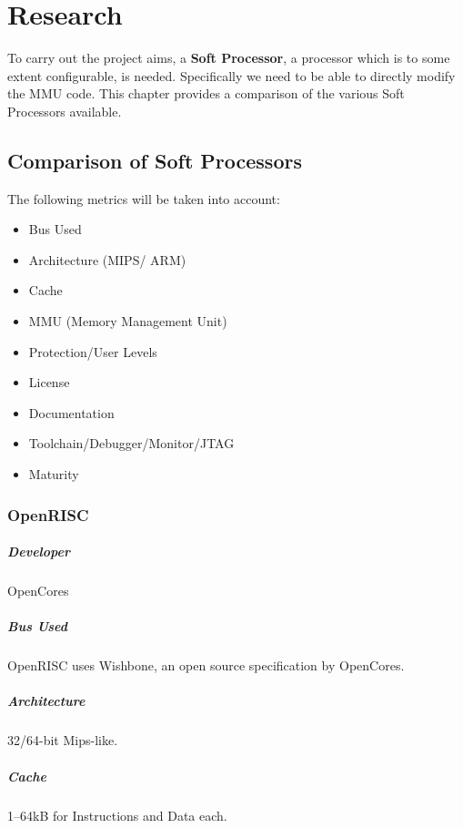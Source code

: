 \chapter{Research}
\label{cha:res}

To carry out the project aims, a \textbf{Soft Processor}, a processor which is to some extent configurable, is needed. Specifically we need to be able to directly modify the MMU code. This chapter provides a comparison of the various Soft Processors available.

\section{Comparison of Soft Processors}
The following metrics will be taken into account:
\begin{itemize}
\item Bus Used
\item Architecture (MIPS/ ARM)
\item Cache
\item MMU (Memory Management Unit)
\item Protection/User Levels
\item License
\item Documentation
\item Toolchain/Debugger/Monitor/JTAG
\item Maturity
\end{itemize}

\subsection{OpenRISC}
\paragraph{Developer} OpenCores
\paragraph{Bus Used} OpenRISC uses Wishbone, an open source specification by OpenCores.
\paragraph{Architecture} 32/64-bit Mips-like.
\paragraph{Cache} 1--64kB for Instructions and Data each.
